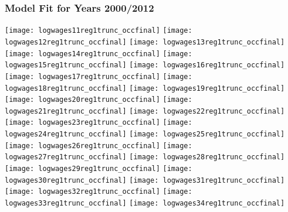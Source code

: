 \documentclass[11pt]{article}
\begin{document}
\subsubsection{Model Fit for Years 2000/2012}

\texttt{[image: logwages11reg1trunc\_occfinal]}
\newline
\texttt{[image: logwages12reg1trunc\_occfinal]}
\clearpage
\texttt{[image: logwages13reg1trunc\_occfinal]}
\newline
\texttt{[image: logwages14reg1trunc\_occfinal]}
\clearpage
\texttt{[image: logwages15reg1trunc\_occfinal]}
\newline
\texttt{[image: logwages16reg1trunc\_occfinal]}
\clearpage
\texttt{[image: logwages17reg1trunc\_occfinal]}
\newline
\texttt{[image: logwages18reg1trunc\_occfinal]}
\clearpage
\texttt{[image: logwages19reg1trunc\_occfinal]}
\newline
\texttt{[image: logwages20reg1trunc\_occfinal]}
\clearpage
\texttt{[image: logwages21reg1trunc\_occfinal]}
\newline
\texttt{[image: logwages22reg1trunc\_occfinal]}
\clearpage
\texttt{[image: logwages23reg1trunc\_occfinal]}
\newline
\texttt{[image: logwages24reg1trunc\_occfinal]}
\clearpage
\texttt{[image: logwages25reg1trunc\_occfinal]}
\newline
\texttt{[image: logwages26reg1trunc\_occfinal]}
\clearpage
\texttt{[image: logwages27reg1trunc\_occfinal]}
\newline
\texttt{[image: logwages28reg1trunc\_occfinal]}
\clearpage
\texttt{[image: logwages29reg1trunc\_occfinal]}
\newline
\texttt{[image: logwages30reg1trunc\_occfinal]}
\clearpage
\texttt{[image: logwages31reg1trunc\_occfinal]}
\newline
\texttt{[image: logwages32reg1trunc\_occfinal]}
\clearpage
\texttt{[image: logwages33reg1trunc\_occfinal]}
\newline
\texttt{[image: logwages34reg1trunc\_occfinal]}
\end{document}

